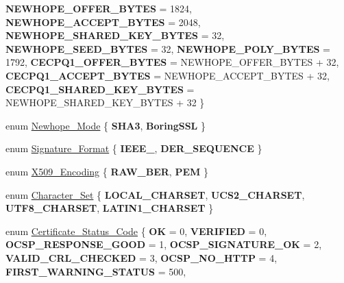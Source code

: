 \begin{DoxyCompactItemize}
{\bfseries N\+E\+W\+H\+O\+P\+E\+\_\+\+O\+F\+F\+E\+R\+\_\+\+B\+Y\+T\+ES} = 1824, 
{\bfseries N\+E\+W\+H\+O\+P\+E\+\_\+\+A\+C\+C\+E\+P\+T\+\_\+\+B\+Y\+T\+ES} = 2048, 
\newline
{\bfseries N\+E\+W\+H\+O\+P\+E\+\_\+\+S\+H\+A\+R\+E\+D\+\_\+\+K\+E\+Y\+\_\+\+B\+Y\+T\+ES} = 32, 
{\bfseries N\+E\+W\+H\+O\+P\+E\+\_\+\+S\+E\+E\+D\+\_\+\+B\+Y\+T\+ES} = 32, 
{\bfseries N\+E\+W\+H\+O\+P\+E\+\_\+\+P\+O\+L\+Y\+\_\+\+B\+Y\+T\+ES} = 1792, 
{\bfseries C\+E\+C\+P\+Q1\+\_\+\+O\+F\+F\+E\+R\+\_\+\+B\+Y\+T\+ES} = N\+E\+W\+H\+O\+P\+E\+\_\+\+O\+F\+F\+E\+R\+\_\+\+B\+Y\+T\+ES + 32, 
\newline
{\bfseries C\+E\+C\+P\+Q1\+\_\+\+A\+C\+C\+E\+P\+T\+\_\+\+B\+Y\+T\+ES} = N\+E\+W\+H\+O\+P\+E\+\_\+\+A\+C\+C\+E\+P\+T\+\_\+\+B\+Y\+T\+ES + 32, 
{\bfseries C\+E\+C\+P\+Q1\+\_\+\+S\+H\+A\+R\+E\+D\+\_\+\+K\+E\+Y\+\_\+\+B\+Y\+T\+ES} = N\+E\+W\+H\+O\+P\+E\+\_\+\+S\+H\+A\+R\+E\+D\+\_\+\+K\+E\+Y\+\_\+\+B\+Y\+T\+ES + 32
 \}
\item 
enum \mbox{\hyperlink{namespace_botan_a42a70d7cfb95e4f7773d3b52dc98ad61}{Newhope\+\_\+\+Mode}} \{ {\bfseries S\+H\+A3}, 
{\bfseries Boring\+S\+SL}
 \}
\item 
enum \mbox{\hyperlink{namespace_botan_ad8a9578625edf847cbcba3ae15648cda}{Signature\+\_\+\+Format}} \{ {\bfseries I\+E\+E\+E\+\_}, 
{\bfseries D\+E\+R\+\_\+\+S\+E\+Q\+U\+E\+N\+CE}
 \}
\item 
enum \mbox{\hyperlink{namespace_botan_a53759b4ed1fb93549f307fcf68729d2f}{X509\+\_\+\+Encoding}} \{ {\bfseries R\+A\+W\+\_\+\+B\+ER}, 
{\bfseries P\+EM}
 \}
\item 
enum \mbox{\hyperlink{namespace_botan_a416eb1af7496d74b885a20ff833e9b33}{Character\+\_\+\+Set}} \{ {\bfseries L\+O\+C\+A\+L\+\_\+\+C\+H\+A\+R\+S\+ET}, 
{\bfseries U\+C\+S2\+\_\+\+C\+H\+A\+R\+S\+ET}, 
{\bfseries U\+T\+F8\+\_\+\+C\+H\+A\+R\+S\+ET}, 
{\bfseries L\+A\+T\+I\+N1\+\_\+\+C\+H\+A\+R\+S\+ET}
 \}
\item 
enum \mbox{\hyperlink{namespace_botan_ae1e907dc90937bdda30f65216e68ff2b}{Certificate\+\_\+\+Status\+\_\+\+Code}} \{ \newline
{\bfseries OK} = 0, 
{\bfseries V\+E\+R\+I\+F\+I\+ED} = 0, 
{\bfseries O\+C\+S\+P\+\_\+\+R\+E\+S\+P\+O\+N\+S\+E\+\_\+\+G\+O\+OD} = 1, 
{\bfseries O\+C\+S\+P\+\_\+\+S\+I\+G\+N\+A\+T\+U\+R\+E\+\_\+\+OK} = 2, 
\newline
{\bfseries V\+A\+L\+I\+D\+\_\+\+C\+R\+L\+\_\+\+C\+H\+E\+C\+K\+ED} = 3, 
{\bfseries O\+C\+S\+P\+\_\+\+N\+O\+\_\+\+H\+T\+TP} = 4, 
{\bfseries F\+I\+R\+S\+T\+\_\+\+W\+A\+R\+N\+I\+N\+G\+\_\+\+S\+T\+A\+T\+US} = 500, 

\end{DoxyCompactItemize}

